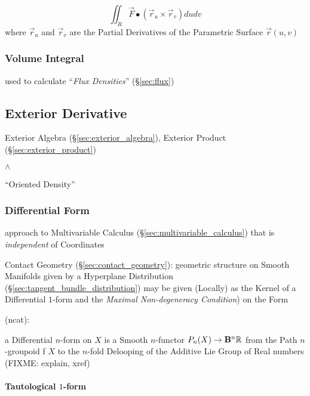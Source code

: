 \[
  \iint_{R} \vec{F} \bullet (\vec{r}_u \times \vec{r}_v) du dv
\]
where $\vec{r}_u$ and $\vec{r}_v$ are the Partial Derivatives of the Parametric
Surface $\vec{r}(u,v)$



\subsubsection{Volume Integral}\label{sec:volume_integral}

used to calculate ``\emph{Flux Densities}'' (\S\ref{sec:flux}) %



\subsection{Exterior Derivative}\label{sec:exterior_derivative}

\fist Exterior Algebra (\S\ref{sec:exterior_algebra}), Exterior Product
(\S\ref{sec:exterior_product})

$\wedge$

``Oriented Density'' %



\subsubsection{Differential Form}\label{sec:differential_form}

approach to Multivariable Calculus (\S\ref{sec:multivariable_calculus})
that is \emph{independent} of Coordinates

\fist Contact Geometry (\S\ref{sec:contact_geometry}): geometric structure on
Smooth Manifolds given by a Hyperplane Distribution
(\S\ref{sec:tangent_bundle_distribution}) may be given (Locally) as the Kernel
of a Differential $1$-form and the \emph{Maximal Non-degeneracy Condition}) on
the Form

(ncat):

a Differential $n$-form on $X$ is a Smooth $n$-functor $P_n(X) \rightarrow
\mathbf{B}^n\mathbb{R}$ from the Path $n$-groupoid f $X$ to the $n$-fold Delooping
of the Additive Lie Group of Real numbers (FIXME: explain, xref)



\paragraph{Tautological $1$-form}\label{sec:tautological_1form}\hfill

